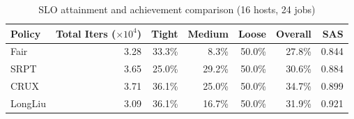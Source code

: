 \begin{table}[t]
\centering
\caption{SLO attainment and achievement comparison (16 hosts, 24 jobs)}
\label{tab:slo_16host}
\begin{tabular}{l|r|r|r|r|r|r}
\hline
Policy & Total Iters ($\times 10^4$) & Tight & Medium & Loose & Overall & SAS \\
\hline
Fair & 3.28 & 33.3\% & 8.3\% & 50.0\% & 27.8\% & 0.844 \\
SRPT & 3.65 & 25.0\% & 29.2\% & 50.0\% & 30.6\% & 0.884 \\
CRUX & 3.71 & 36.1\% & 25.0\% & 50.0\% & 34.7\% & 0.899 \\
LongLiu & 3.09 & 36.1\% & 16.7\% & 50.0\% & 31.9\% & 0.921 \\
\hline
\end{tabular}
\end{table}
